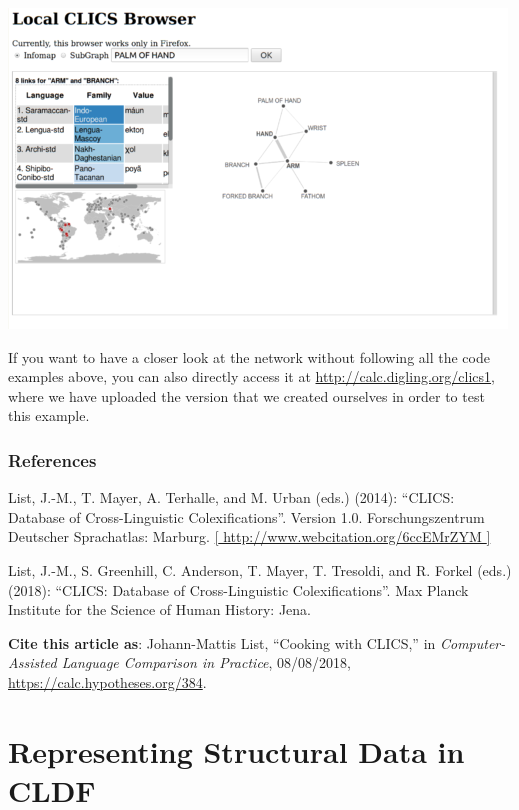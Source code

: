 \documentclass[
  english,
  a4paper,
  oneside,tablecaptionabove
]{scrbook}
\begin{document}
\href{http://calc.digling.org/clics1/graph.html?infomap_42_HAND}{\includegraphics[width=5.20833in,height=3.34375in]{images/__calc.hypotheses.org_files_2018_08_local-clics-500x321.png}}

If you want to have a closer look at the network without following all
the code examples above, you can also directly access it at
\url{http://calc.digling.org/clics1}, where we have uploaded the
version that we created ourselves in order to test this example.

\hypertarget{references}{\subsection*{References}\label{references}}

List, J.-M., T. Mayer, A. Terhalle, and M. Urban (eds.) (2014):
``CLICS: Database of Cross-Linguistic Colexifications''. Version
1.0. Forschungszentrum Deutscher Sprachatlas: Marburg.
\href{//www.webcitation.org/6ccEMrZYM”}{{[}
http://www.webcitation.org/6ccEMrZYM {]}}

List, J.-M., S. Greenhill, C. Anderson, T. Mayer, T. Tresoldi, and
R. Forkel (eds.) (2018): ``CLICS: Database of Cross-Linguistic
Colexifications''. Max Planck Institute for the Science of Human
History: Jena.

\textbf{Cite this article as}: Johann-Mattis List, ``Cooking with CLICS,''
in \emph{Computer-Assisted Language Comparison in Practice},
08/08/2018, \url{https://calc.hypotheses.org/384}.

\hypertarget{representing-structural-data-in-cldf}{%
\chapter{Representing Structural Data in
CLDF}\label{representing-structural-data-in-cldf}}
\end{document}
